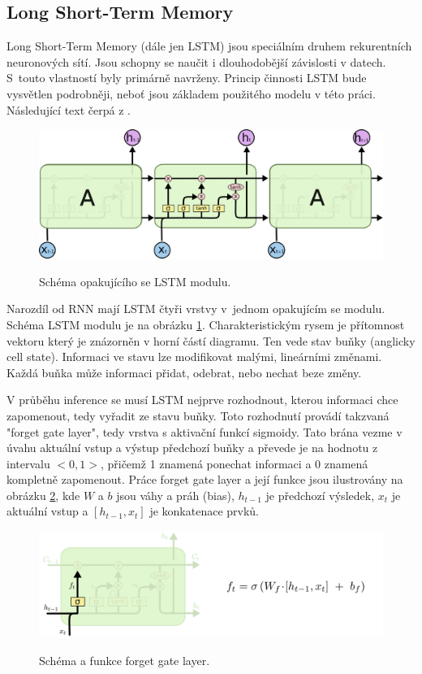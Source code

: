 \subsection{Long Short-Term Memory}
\label{lstmTeorie}
Long Short-Term Memory (dále jen LSTM) 
jsou speciálním druhem rekurentních neuronových sítí.
Jsou schopny se naučit i dlouhodobější závislosti v datech.
S~touto vlastností byly primárně navrženy.
Princip činnosti LSTM bude vysvětlen podrobněji,
neboť jsou základem použitého modelu v této práci.
Následující text čerpá z \cite{colah_lstm}.
\par

\begin{figure}[h]\centering
    \centering
    \includegraphics[width=0.8\linewidth]{obrazky/LSTM3-chain.png}\\[1pt]  
    \caption{Schéma opakujícího se LSTM modulu. \cite{colah_lstm}}    
    \label{obrazekLSTMBunka}
\end{figure}

Narozdíl od RNN mají LSTM čtyři vrstvy v~jednom opakujícím se modulu.
Schéma LSTM modulu je na obrázku \ref{obrazekLSTMBunka}.
Charakteristickým rysem je přítomnost vektoru
který je znázorněn v horní částí diagramu.
Ten vede stav buňky (anglicky cell state).
Informaci ve stavu lze modifikovat malými, lineárními změnami.
Každá buňka může informaci přidat, odebrat, nebo nechat beze změny.
\par

V průběhu inference se musí LSTM nejprve rozhodnout,
kterou informaci chce zapomenout, 
tedy vyřadit ze stavu buňky.
Toto rozhodnutí provádí takzvaná "forget gate layer",
tedy vrstva s aktivační funkcí sigmoidy.
Tato brána vezme v úvahu aktuální vstup a výstup předchozí buňky
a převede je na hodnotu z intervalu $<0,1>$,
přičemž 1 znamená ponechat informaci
a 0 znamená kompletně zapomenout.
Práce forget gate layer a její funkce jsou ilustrovány na obrázku 
\ref{obrazekForgetGate}, kde $W$ a $b$ jsou váhy a práh (bias),
$h_{t-1}$ je předchozí výsledek, $x_t$ je aktuální vstup a 
$[h_{t-1}, x_t]$ je konkatenace prvků.

\begin{figure}[h]\centering
    \centering
    \includegraphics[width=0.8\linewidth]{obrazky/LSTM3-focus-f.png}\\[1pt]  
    \caption{Schéma a funkce forget gate layer. \cite{colah_lstm}}    
    \label{obrazekForgetGate}
\end{figure}

